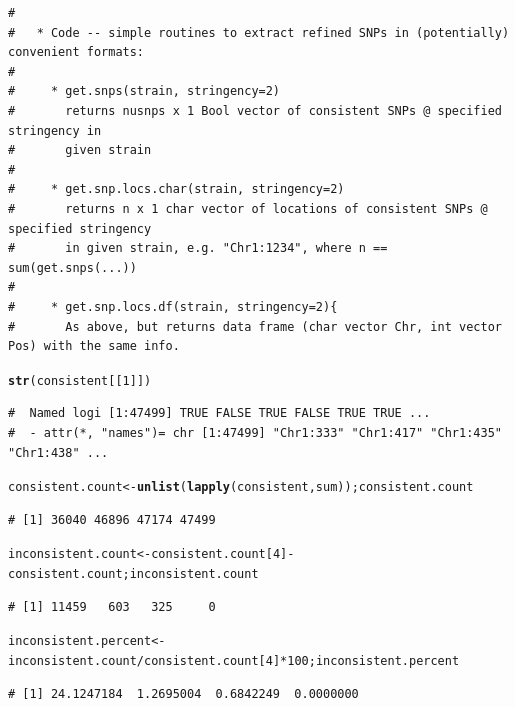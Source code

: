 \documentclass{article}\usepackage[]{graphicx}\usepackage[]{color}
\makeatletter
\newcommand{\hlnum}[1]{\textcolor[rgb]{0.686,0.059,0.569}{#1}}%
\newcommand{\hlopt}[1]{\textcolor[rgb]{0,0,0}{#1}}%
\newcommand{\hlstd}[1]{\textcolor[rgb]{0.345,0.345,0.345}{#1}}%
\newcommand{\hlkwb}[1]{\textcolor[rgb]{0.69,0.353,0.396}{#1}}%
\newcommand{\hlkwd}[1]{\textcolor[rgb]{0.737,0.353,0.396}{\textbf{#1}}}%
\newenvironment{kframe}{%
 \def\at@end@of@kframe{}%
 \ifinner\ifhmode%
  \def\at@end@of@kframe{\end{minipage}}%
  \begin{minipage}{\columnwidth}%
 \fi\fi%
 \def\FrameCommand##1{\hskip\@totalleftmargin \hskip-\fboxsep
 \colorbox{shadecolor}{##1}\hskip-\fboxsep
     \hskip-\linewidth \hskip-\@totalleftmargin \hskip\columnwidth}%
 \MakeFramed {\advance\hsize-\width
   \@totalleftmargin\z@ \linewidth\hsize
   \@setminipage}}%
 {\par\unskip\endMakeFramed%
 \at@end@of@kframe}
\newenvironment{knitrout}{}{} %
\makeatother
\begin{document}
\begin{knitrout}
\begin{kframe}
\begin{verbatim}
# 
#   * Code -- simple routines to extract refined SNPs in (potentially) convenient formats:
# 
#     * get.snps(strain, stringency=2)
#       returns nusnps x 1 Bool vector of consistent SNPs @ specified stringency in
#       given strain
# 
#     * get.snp.locs.char(strain, stringency=2)
#       returns n x 1 char vector of locations of consistent SNPs @ specified stringency
#       in given strain, e.g. "Chr1:1234", where n == sum(get.snps(...))
# 
#     * get.snp.locs.df(strain, stringency=2){
#       As above, but returns data frame (char vector Chr, int vector Pos) with the same info.
\end{verbatim}
\end{kframe}
\end{knitrout}
\begin{knitrout}\tiny
{}\color{fgcolor}\begin{kframe}
\begin{alltt}
\hlkwd{str}\hlstd{(consistent[[}\hlnum{1}\hlstd{]])}
\end{alltt}
\begin{verbatim}
#  Named logi [1:47499] TRUE FALSE TRUE FALSE TRUE TRUE ...
#  - attr(*, "names")= chr [1:47499] "Chr1:333" "Chr1:417" "Chr1:435" "Chr1:438" ...
\end{verbatim}
\end{kframe}
\end{knitrout}
\begin{knitrout}\footnotesize
{}\color{fgcolor}\begin{kframe}
\begin{alltt}
\hlstd{consistent.count} \hlkwb{<-} \hlkwd{unlist}\hlstd{(}\hlkwd{lapply}\hlstd{(consistent, sum)) ; consistent.count}
\end{alltt}
\begin{verbatim}
# [1] 36040 46896 47174 47499
\end{verbatim}
\begin{alltt}
\hlstd{inconsistent.count} \hlkwb{<-} \hlstd{consistent.count[}\hlnum{4}\hlstd{]} \hlopt{-} \hlstd{consistent.count; inconsistent.count}
\end{alltt}
\begin{verbatim}
# [1] 11459   603   325     0
\end{verbatim}
\begin{alltt}
\hlstd{inconsistent.percent} \hlkwb{<-} \hlstd{inconsistent.count}\hlopt{/}\hlstd{consistent.count[}\hlnum{4}\hlstd{]}\hlopt{*}\hlnum{100}\hlstd{; inconsistent.percent}
\end{alltt}
\begin{verbatim}
# [1] 24.1247184  1.2695004  0.6842249  0.0000000
\end{verbatim}
\end{kframe}
\end{knitrout}
\end{document}
